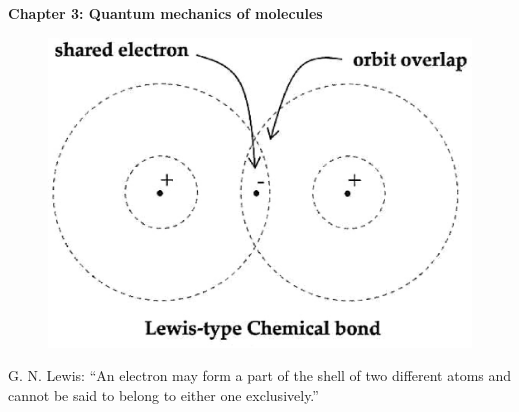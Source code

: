\renewcommand{\theequation}{3.\arabic{equation}}

\begin{frame}
\begin{center}
{\bf Chapter 3: Quantum mechanics of molecules}\\
\end{center}

\begin{figure}
\centering
\includegraphics[scale=0.20]{figs/intro3}
\end{figure}

\begin{center}
{\footnotesize G. N. Lewis: ``An electron may form a part of the shell of two different atoms and cannot be said to belong to either one exclusively.''}
\end{center}

\end{frame}

\scriptsize










